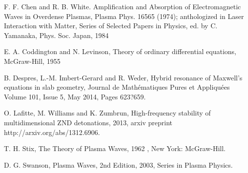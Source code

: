 \documentclass{article}
\begin{document}
\begin{thebibliography}{99}


F. F. Chen and R. B. White.
Amplification and Absorption of 
Electromagnetic Waves in Overdense Plasmas, Plasma Phys. 16565
 (1974); anthologized in Laser Interaction with Matter, 
Series of Selected Papers in Physics, ed. by C. Yamanaka,  Phys. Soc. Japan, 1984



 E. A. Coddington and N. Levinson,
Theory of ordinary differential equations, 
McGraw-Hill, 1955 


 B. Despres, L.-M. Imbert-Gerard and R. Weder, 
Hybrid resonance of Maxwell's equations in slab geometry, 
Journal de Mathématiques Pures et Appliquées
Volume 101, Issue 5, May 2014, Pages 623?659.



 O. Lafitte, M. Williams and K. Zumbrun,
High-frequency stability of multidimensional ZND detonations, 2013,
arxiv preprint http://arxiv.org/abs/1312.6906.


 T. H. Stix,
The Theory of Plasma Waves, 1962 , New York: McGraw-Hill. 

 D.  G. Swanson,
Plasma Waves, 2nd Edition, 2003,
Series in Plasma Physics.



\end{thebibliography}
\end{document}
